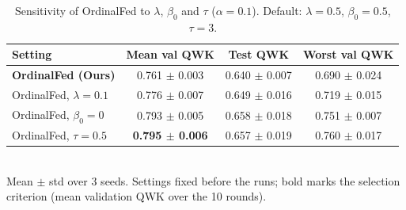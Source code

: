 \begin{table}[!t]
\centering
\caption{Sensitivity of OrdinalFed to $\lambda$, $\beta_0$ and $\tau$ ($\alpha=0.1$). Default: $\lambda=0.5$, $\beta_0=0.5$, $\tau=3$.}
\label{tab:sensitivity}
\begin{tabular}{lccc}
\toprule
Setting & Mean val QWK & Test QWK & Worst val QWK \\
\midrule
\textbf{OrdinalFed (Ours)} & 0.761 $\pm$ 0.003 & 0.640 $\pm$ 0.007 & 0.690 $\pm$ 0.024 \\
OrdinalFed, $\lambda=0.1$ & 0.776 $\pm$ 0.007 & 0.649 $\pm$ 0.016 & 0.719 $\pm$ 0.015 \\
OrdinalFed, $\beta_0=0$ & 0.793 $\pm$ 0.005 & 0.658 $\pm$ 0.018 & 0.751 $\pm$ 0.007 \\
OrdinalFed, $\tau=0.5$ & \textbf{0.795 $\pm$ 0.006} & 0.657 $\pm$ 0.019 & 0.760 $\pm$ 0.017 \\
\bottomrule
\end{tabular}
\\[2pt]{\footnotesize Mean $\pm$ std over 3 seeds. Settings fixed before the runs; bold marks the selection criterion (mean validation QWK over the 10 rounds).}
\end{table}
